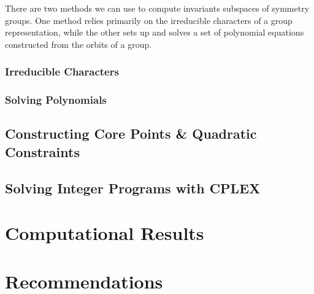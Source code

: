 \documentclass[11pt]{article} %
\theoremstyle{definition}
\begin{document}
There are two methods we can use to compute invariants subspaces of symmetry groups. One method relies primarily on the irreducible characters of a group representation, while the other sets up and solves a set of polynomial equations constructed from the orbits of a group. 

\subsubsection{Irreducible Characters}



\subsubsection{Solving Polynomials}

\subsection{Constructing Core Points \& Quadratic Constraints}

\subsection{Solving Integer Programs with CPLEX}

\section{Computational Results}

\section{Recommendations}
\end{document}
